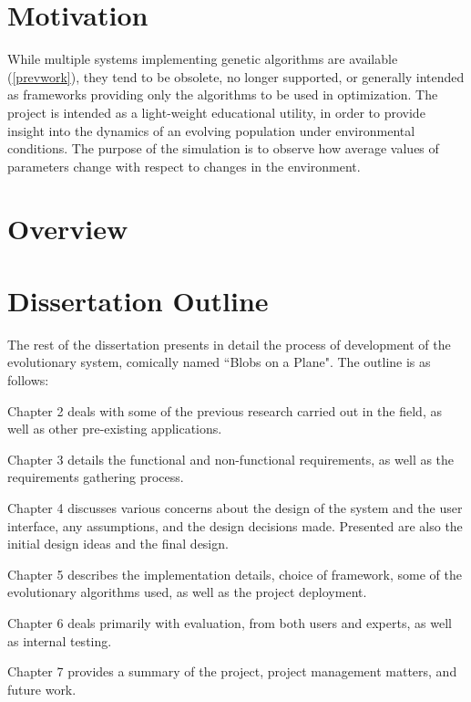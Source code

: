 \section{Motivation}
While multiple systems implementing genetic algorithms are available (\ref{prevwork}), they tend to be obsolete, no longer supported, or generally intended as frameworks providing only the algorithms to be used in optimization. The project is intended as a light-weight educational utility, in order to provide insight into the dynamics of an evolving population under environmental conditions. The purpose of the simulation is to observe how average values of parameters change with respect to changes in the environment.

\section{Overview}



\section{Dissertation Outline}
The rest of the dissertation presents in detail the process of development of the evolutionary system, comically named ``Blobs on a Plane". The outline is as follows:

Chapter 2 deals with some of the previous research carried out in the field, as well as other pre-existing applications.

Chapter 3 details the functional and non-functional requirements, as well as the requirements gathering process.

Chapter 4 discusses various concerns about the design of the system and the user interface, any assumptions, and the design decisions made. Presented are also the initial design ideas and the final design.

Chapter 5 describes the implementation details, choice of framework, some of the evolutionary algorithms used, as well as the project deployment.

Chapter 6 deals primarily with evaluation, from both users and experts, as well as internal testing.

Chapter 7 provides a summary of the project, project management matters, and future work.